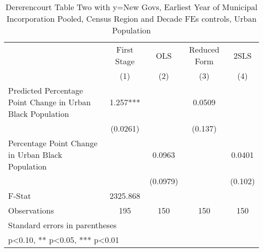 \begin{table}[htbp]\centering
\def\sym#1{\ifmmode^{#1}\else\(^{#1}\)\fi}
\caption{Dererencourt Table Two with y=New Govs, Earliest Year of Municipal Incorporation  Pooled, Census Region and Decade FEs controls, Urban Population}
\begin{tabular}{l*{4}{c}}
\toprule
                    & First Stage   &         OLS   &Reduced Form   &        2SLS   \\
                    &\multicolumn{1}{c}{(1)}   &\multicolumn{1}{c}{(2)}   &\multicolumn{1}{c}{(3)}   &\multicolumn{1}{c}{(4)}   \\
\midrule
Predicted Percentage Point Change in Urban Black Population&       1.257***&               &      0.0509   &               \\
                    &    (0.0261)   &               &     (0.137)   &               \\
\addlinespace
Percentage Point Change in Urban Black Population&               &      0.0963   &               &      0.0401   \\
                    &               &    (0.0979)   &               &     (0.102)   \\
\midrule
F-Stat              &    2325.868   &               &               &               \\
Observations        &         195   &         150   &         150   &         150   \\
\bottomrule
\multicolumn{5}{l}{\footnotesize Standard errors in parentheses}\\
\multicolumn{5}{l}{\footnotesize * p<0.10, ** p<0.05, *** p<0.01}\\
\end{tabular}
\end{table}
